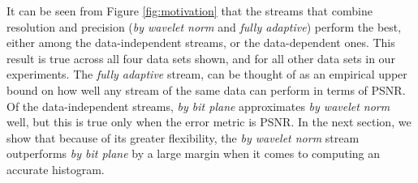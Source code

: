 It can be seen from Figure \ref{fig:motivation} that the streams that combine resolution and
precision (\emph{by wavelet norm} and \emph{fully adaptive}) perform the best, either among the
data-independent streams, or the data-dependent ones. This result is true across all four data sets shown,
and for all other data sets in our experiments. The \emph{fully adaptive} stream, can be thought of
as an empirical upper bound on how well any stream of the same data can perform in terms of PSNR. Of
the data-independent streams, \emph{by bit plane} approximates \emph{by wavelet norm}  well, but this
is true only when the error metric is PSNR. In the next section, we show that because of its greater
flexibility, the \emph{by wavelet norm} stream outperforms \emph{by bit plane} by a large margin
when it comes to computing an accurate histogram.




